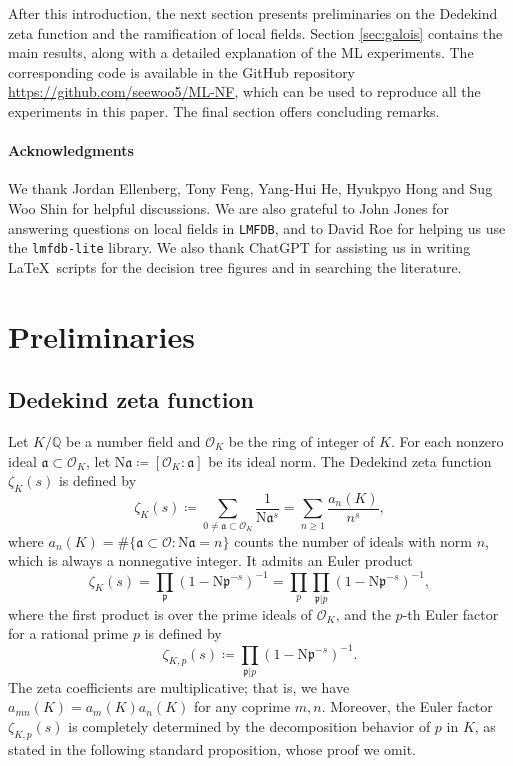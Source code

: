 \documentclass[letterpaper, 10pt]{article}
\newcommand{\rN}{\mathrm{N}}
\newcommand{\bQ}{\mathbb{Q}}
\newcommand{\cO}{\mathcal{O}}
\newcommand{\fra}{\mathfrak{a}}
\newcommand{\frp}{\mathfrak{p}}
\newcommand{\1}{\mathds{1}}	%
\theoremstyle{definition}
\theoremstyle{remark}
\begin{document}
After this introduction, the next section presents preliminaries on the Dedekind zeta function and the ramification of local fields. Section \ref{sec:galois} contains the main results, along with a detailed explanation of the ML experiments. The corresponding code is available in the GitHub repository \href{https://github.com/seewoo5/ML-NF}{https://github.com/seewoo5/ML-NF}, which can be used to reproduce all the experiments in this paper.
The final section offers concluding remarks.


\paragraph{Acknowledgments}

We thank Jordan Ellenberg, Tony Feng, Yang-Hui He, Hyukpyo Hong and Sug Woo Shin for helpful discussions.
We are also grateful to John Jones for answering questions on local fields in \texttt{LMFDB}, and to David Roe for helping us  use the \texttt{lmfdb-lite} library.
We also thank ChatGPT for assisting us in writing  \LaTeX \ scripts for the decision tree figures and  in searching the literature. 




\section{Preliminaries}

\subsection{Dedekind zeta function}
\label{subsec:prelim_dedekindzeta}

Let $K / \bQ$ be a number field and $\cO_K$ be the ring of integer of $K$.
For each nonzero ideal $\fra \subset \cO_K$, let $\rN \fra \coloneqq [\cO_K : \fra]$ be its ideal norm.
The Dedekind zeta function $\zeta_K(s)$ is defined by 
\begin{equation}
    \zeta_K(s) \coloneqq \sum_{0 \ne \fra \subset \cO_K} \frac{1}{\rN\fra^s} = \sum_{n \ge 1} \frac{a_n(K)}{n^s},
\end{equation}
where $a_n(K) = \#\{\fra \subset \cO: \rN \fra = n\}$ counts the number of ideals with norm $n$,  which is always a nonnegative integer.
It admits an Euler product
\[
\zeta_K(s) = \prod_{\frp} (1 - \rN\frp^{-s})^{-1} = \prod_{p} \prod_{\frp|p} (1 - \rN\frp^{-s})^{-1},
\]
where the first product is over the prime ideals of $\cO_K$, and the $p$-th Euler factor for a rational prime $p$ is defined by
\begin{equation}
    \zeta_{K, p}(s) \coloneqq \prod_{\frp|p} (1 - \rN \frp^{-s})^{-1}.
\end{equation}
The zeta coefficients are multiplicative; that is, we have $a_{mn}(K) = a_{m}(K)a_{n}(K)$ for any coprime $m, n$. Moreover, the Euler factor $\zeta_{K, p}(s)$ is completely determined by the decomposition behavior of $p$ in $K$, as stated in the following standard proposition, whose proof we omit.
\end{document}
